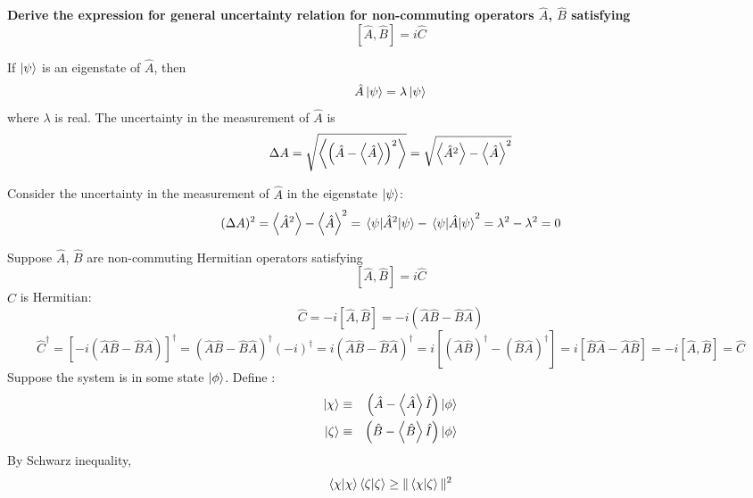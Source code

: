 \documentclass[12pt,a4paper,answers]{exam}
\newcommand{\A}{\hat{A}}
\newcommand{\B}{\hat{B}}
\newcommand{\C}{\hat{C}}
\begin{document}
\begin{questions}
	\setcounter{question}{7}
	\question 	\textbf{Derive the expression for general uncertainty relation for non-commuting operators $ \hat{A} $, $ \hat{B} $ satisfying}
	\[ [ \hat{A} , \hat{B}]  = i \hat{C} \]
	
	\begin{solutionorbox}
		
		
		If $ \ket{\psi} $ is an eigenstate of $ \A $, then 
		\begin{eqnarray}
			\A \ket{\psi} = \lambda \ket{\psi}%
		\end{eqnarray}
		where $ \lambda $ is real.
		The uncertainty in the measurement of $ \A $ is
		\[ \Delta A = \sqrt{\expval{ \left( \A - \expval{\A} \right)^2 }} = \sqrt{\expval{\A^2} - \expval{\A}^2 }  \]
	
		
		Consider the uncertainty in the measurement of $ \A $ in the eigenstate $ \ket{\psi} $:
		\begin{dmath}
			(\Delta A)^2 = \expval{\A^2} - {\expval{\A}}^{2} 
			= \ev{\A^2}{\psi} -  {\ev{\A}{\psi}}^2
			= \lambda^2 - \lambda^2
			= 0
		\end{dmath}
		
		Suppose $ \A $, $ \B $ are non-commuting Hermitian operators satisfying
		\[ [\A, \B] = i \C \]
		$ \C $ is Hermitian:
		\begin{dmath*}
			\C = -i [\A, \B]
			= -i \left( \A\B - \B\A \right) 
		\end{dmath*}
		 \begin{dmath*}
		 	\C^{\dagger} = \left[-i \left( \A\B - \B\A \right)\right]^{\dagger}
		 	= \left( \A\B - \B\A \right)^{\dagger}(-i)^{\dagger}
		 	= i \left(\A\B - \B\A \right)^{\dagger}
		 	= i \left[ \left( \A\B \right)^{\dagger} - \left( \B\A \right)^{\dagger}\right]
		 	= i \left[ \B\A - \A\B \right]
		 	= -i [\A,\B]
		 	= \C
		 \end{dmath*}
		Suppose the system is in some state $ \ket{\phi} $.
		Define :
		\begin{eqnarray}
			\ket{\chi} &\equiv& \left( \A - \expval{\A} \hat{I} \right)\ket{\phi} \\
			\ket{\zeta} &\equiv& \left( \B - \expval{\B} \hat{I} \right)\ket{\phi}
		\end{eqnarray}
		By Schwarz inequality,
		\begin{equation}\label{eqn : Schwarz}
			\braket{\chi} \braket{\zeta} \geq \| \braket{\chi}{\zeta}\|^2 
		\end{equation}
		

\end{solutionorbox}
\end{questions}
\end{document}
